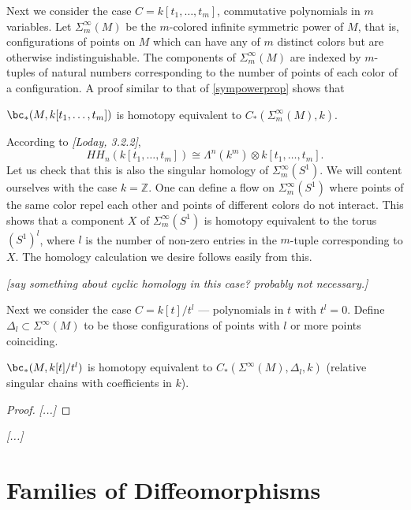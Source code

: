 \documentclass[11pt,leqno]{amsart}
\def\z{\mathbb{Z}}
\def\sub{\subset}
\def\nn#1{{{\it \small [#1]}}}
\begin{document}
\medskip

Next we consider the case $C = k[t_1, \ldots, t_m]$, commutative polynomials in $m$ variables.
Let $\Sigma_m^\infty(M)$ be the $m$-colored infinite symmetric power of $M$, that is, configurations
of points on $M$ which can have any of $m$ distinct colors but are otherwise indistinguishable.
The components of $\Sigma_m^\infty(M)$ are indexed by $m$-tuples of natural numbers
corresponding to the number of points of each color of a configuration.
A proof similar to that of \ref{sympowerprop} shows that

\begin{prop}
$\bc_*(M, k[t_1, \ldots, t_m])$ is homotopy equivalent to $C_*(\Sigma_m^\infty(M), k)$.
\end{prop}

According to \nn{Loday, 3.2.2},
\[
	HH_n(k[t_1, \ldots, t_m]) \cong \Lambda^n(k^m) \otimes k[t_1, \ldots, t_m] .
\]
Let us check that this is also the singular homology of $\Sigma_m^\infty(S^1)$.
We will content ourselves with the case $k = \z$.
One can define a flow on $\Sigma_m^\infty(S^1)$ where points of the same color repel each other and points of different colors do not interact.
This shows that a component $X$ of $\Sigma_m^\infty(S^1)$ is homotopy equivalent
to the torus $(S^1)^l$, where $l$ is the number of non-zero entries in the $m$-tuple
corresponding to $X$.
The homology calculation we desire follows easily from this.

\nn{say something about cyclic homology in this case?  probably not necessary.}

\medskip

Next we consider the case $C = k[t]/t^l$ --- polynomials in $t$ with $t^l = 0$.
Define $\Delta_l \sub \Sigma^\infty(M)$ to be those configurations of points with $l$ or
more points coinciding.

\begin{prop}
$\bc_*(M, k[t]/t^l)$ is homotopy equivalent to $C_*(\Sigma^\infty(M), \Delta_l, k)$
(relative singular chains with coefficients in $k$).
\end{prop}

\begin{proof}
\nn{...}
\end{proof}

\nn{...}




\appendix

\section{Families of Diffeomorphisms}  \label{sec:localising}
\end{document}

